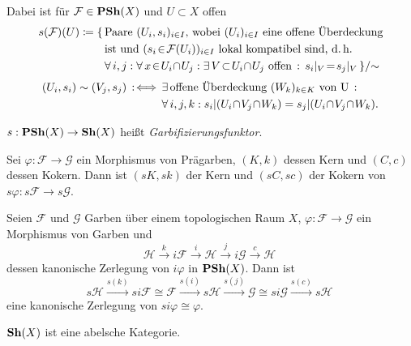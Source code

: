 \documentclass{cheat-sheet}
\newcommand{\Fais}{\mathcal{F}} %
\newcommand{\Garb}{\mathcal{G}} %
\newcommand{\Karb}{\mathcal{H}} %
\newcommand{\Carb}{\mathcal{H}} %
\newcommand{\Iarb}{\mathcal{H}} %
\begin{document}
\begin{bem}
  Dabei ist für $\Fais \in \PSh(X)$ und $U \subset X$ offen
  \begin{align*}
    s(\Fais)(U) \coloneqq \{ \, & \text{Paare $(U_i, s_i)_{i \in I}$, wobei $(U_i)_{i \in I}$ eine offene Überdeckung} \\
     & \text{ist und $(s_i \!\in\! \Fais(U_i))_{i \in I}$ lokal kompatibel sind, \dh{}} \\
     & \fa{i, j\!}\! \fa{x \!\in\! U_i \!\cap\! U_j\!}\! \ex{V \!\subset\! U_i \!\cap\! U_j \text{ offen}} s_i|_V \!=\! s_j|_V \, \} / {\sim}
  \end{align*}\vspace{-16pt}
  \begin{align*}
    (U_i, s_i) \sim (V_j, s_j) \!\! \coloniff \, & \ex{\text{offene Überdeckung $(W_k)_{k \in K}$ von U}} \\
    & \fa{i, j, k\!}\! s_i|(U_i \!\cap\! V_j \!\cap\! W_k) = s_j|(U_i \!\cap\! V_j \!\cap\! W_k).
  \end{align*}
\end{bem}

\begin{defn}
  $s : \mathbf{PSh}(X) \to \mathbf{Sh}(X)$ \enspace heißt \emph{Garbifizierungsfunktor}.
\end{defn}


\begin{lem}
  Sei $\varphi : \Fais \to \Garb$ ein Morphismus von Prägarben,
  $(K, k)$ dessen Kern und $(C, c)$ dessen Kokern.
  Dann ist $(sK, sk)$ der Kern und $(sC, sc)$ der Kokern von $s \varphi : s \Fais \to s \Garb$.
\end{lem}

\begin{prop}
  Seien $\Fais$ und $\Garb$ Garben über einem topologischen Raum $X$, $\varphi : \Fais \to \Garb$ ein Morphismus von Garben und
  \[ \Karb \xrightarrow{k} i \Fais \xrightarrow{i} \Iarb \xrightarrow{j} i \Garb \xrightarrow{c} \Carb \ \]
  dessen kanonische Zerlegung von $i \varphi$ in $\mathbf{PSh}(X)$. Dann ist
  \[ s \Karb \xrightarrow{s(k)} si \Fais \cong \Fais \xrightarrow{s(i)} s \Iarb \xrightarrow{s(j)} \Garb \cong si \Garb \xrightarrow{s(c)} s \Carb \ \]
  eine kanonische Zerlegung von $si \varphi \cong \varphi$.
\end{prop}

\begin{kor}
  $\mathbf{Sh}(X)$ ist eine abelsche Kategorie.
\end{kor}
\end{document}

